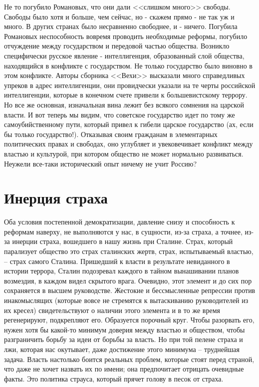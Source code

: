 \documentclass{book}
\begin{document}
Не то погубило Романовых, что они дали <<слишком много>> свободы. Свободы было хотя и больше, чем сейчас, но - ска­жем прямо - не так уж и много. В других странах было не­сравненно свободнее, и - ничего. Погубила Романовых неспо­собность вовремя  проводить необходимые реформы, погуби­ло отчуждение между государством и передовой частью обще­ства. Возникло специфически русское явление - интеллиген­ция, образованный слой общества, находящийся в конфликте с государством. Не только государство было виновно в этом конфликте. Авторы сборника <<Вехи>> высказали много спра­ведливых упреков в адрес интеллигенции, они провидчески указали на те черты российской интеллигенции, которые в ко­нечном счете привели к большевистскому террору. Но все же основная, изначальная вина лежит без всякого сомнения на царской власти. И вот теперь мы видим, что советское государство идет по тому же самоубийственному пути, который привел к гибели царское государство (ах, если бы только государство!). Отказывая своим гражданам в элементарных 
политических правах и свободах, оно углубляет и увековечивает конфликт между властью и культурой, при котором общество не может нормально развиваться. Неужели все-таки исторический опыт ничему не учит Россию?



\section{Инерция страха}

Оба условия постепенной демократизации, давление снизу и способность к реформам наверху, не выполняются у нас, в сущности, из-за страха, а точнее, из-за инерции страха,  вошедшего в нашу жизнь при Сталине. Страх, который парализует общество это страх сталинских жертв, страх, испытываемый властью, -- страх самого Сталина. Пришедший к власти в результате невиданного в истории террора, Сталин подозревал каждого в тайном вынашивании планов возмездия, в каждом видел скрытого врага. Очевидно, этот элемент и до сих пор сохраняется в высшем руководстве. Жестокие и бессмысленные репрессии против инакомыслящих (которые вовсе не стремятся к вытаскиванию руководителей из их кресел) свидетельствуют о наличии этого элемента и в то же время регенерируют, подкрепляют его. Образуется порочный круг. Чтобы разорвать его, нужен хотя бы какой-то минимум доверия между властью и обществом, чтобы разграничить борьбу за идеи от борьбы за власть. Но при той пелене страха и лжи, которая нас окутывает, даже достижение этого минимума -- 
труднейшая задача. Власть настолько боится реальных проблем, которые стоят перед страной, что даже не хочет назвать их по имени; она предпочитает отрицать очевидные факты. Это политика страуса, который прячет голову в песок от страха.
\end{document}
